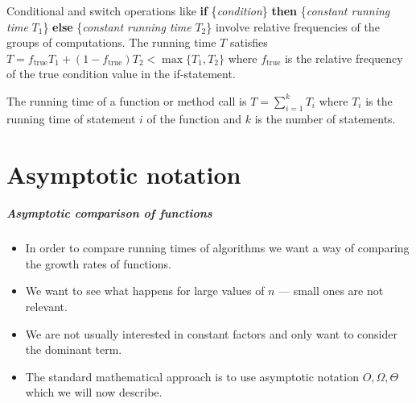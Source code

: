 Conditional and switch operations like \textbf{if}
\{\emph{condition}\} \textbf{then} \{\emph{constant running time}
$T_1$\} \textbf{else} \{\emph{constant running time} $T_2$\} involve
relative frequencies of the groups of computations.  The running time
$T$ satisfies $T = f_\mathrm{true} T_1 + (1 - f_\mathrm{true}) T_2 <
\max \{ T_1, T_2 \}$ where $f_\mathrm{true}$ is the relative frequency
of the true condition value in the if-statement.

The running time of a function or method call is $T = \sum_{i=1}^{k}T_i$
where $T_i$ is the running time of statement \(i\) of the function
and $k$ is the number of statements.


\chapter{Asymptotic notation} %

\paragraph{Asymptotic comparison of functions}
\begin{itemize}
\item In order to compare running times of algorithms we want a way of comparing
 the growth rates of functions. 
\item We want to see what happens for large values of $n$ --- small ones are not
 relevant.
\item We are not usually interested in constant factors and only want to consider the 
dominant term.
\item The standard mathematical approach is to use asymptotic notation 
$O, \Omega, \Theta$ which we will now describe.
\end{itemize}


